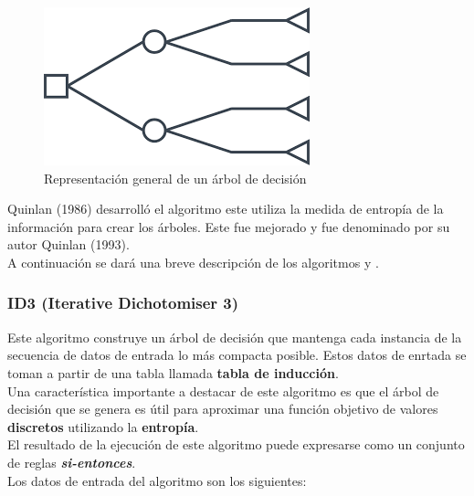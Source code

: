 \pagebreak
\begin{figure}[!htbp]
	\hypertarget{fig:arbol-decision-ejemplo}{\hspace{1pt}}
	\begin{center}
		\includegraphics[height=0.3\textheight]{capitulo2/images/arbol-decision-ejemplo.png}
		\caption{Representación general de un árbol de decisión}
		\label{fig:arbol-decision-ejemplo}
	\end{center}
\end{figure}

Quinlan (1986) desarrolló el algoritmo  este utiliza la medida de entropía de la información para crear los árboles. Este fue mejorado y fue denominado  por su autor Quinlan (1993).\\

A continuación se dará una breve descripción de los algoritmos  y .

\subsubsection{ID3 (Iterative Dichotomiser 3)} \label{id3}
Este algoritmo construye un árbol de decisión que mantenga cada instancia de la secuencia de datos de entrada lo más compacta posible. Estos datos de enrtada se toman a partir de una tabla llamada \textbf{tabla de inducción}.\\

Una característica importante a destacar de este algoritmo es que el árbol de decisión que se genera es útil para aproximar una función objetivo de valores \textbf{discretos} utilizando la \textbf{entropía}.\\

El resultado de la ejecución de este algoritmo puede expresarse como un conjunto de reglas \textbf{\textit{si-entonces}}.\\

Los datos de entrada del algoritmo son los siguientes:\\

